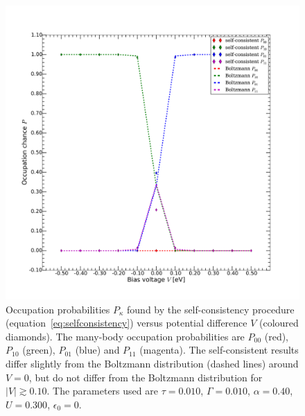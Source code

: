 \begin{figure}[p]
    \centering
    \includegraphics[width=.95\textwidth]{pdf/selfconsistent_low_temperature_1_v2.pdf}
    \caption{Occupation probabilities $P_{\kappa}$ found by the self-consistency procedure (equation~\ref{eq:selfconsistency}) versus potential difference $V$ (coloured diamonds). The many-body occupation probabilities are $P_{00}$ (red), $P_{10}$ (green), $P_{01}$ (blue) and $P_{11}$ (magenta). The self-consistent results differ slightly from the Boltzmann distribution (dashed lines) around $V=0$, but do not differ from the Boltzmann distribution for $\left|V\right|\gtrsim 0.10$. The parameters used are $\tau=0.010$, $\Gamma=0.010$, $\alpha=0.40$, $U=0.300$, $\epsilon_0=0$. }
    \label{fig:occprob}
\end{figure} \clearpage

